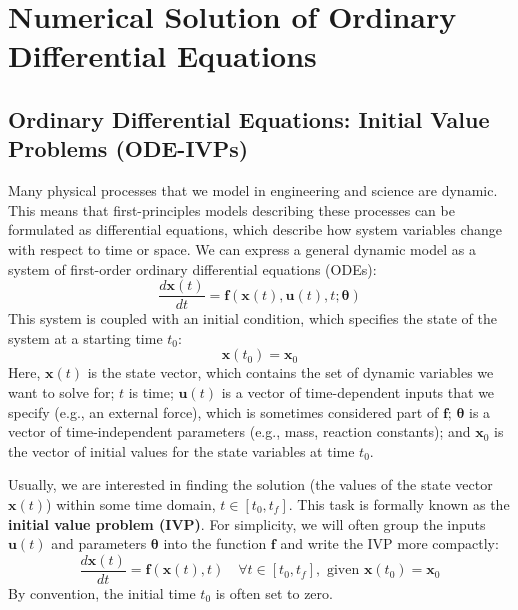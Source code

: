 \chapter{Numerical Solution of Ordinary Differential Equations}

\section{Ordinary Differential Equations: Initial Value Problems (ODE-IVPs)}

Many physical processes that we model in engineering and science are dynamic. This means that first-principles models describing these processes can be formulated as differential equations, which describe how system variables change with respect to time or space. We can express a general dynamic model as a system of first-order ordinary differential equations (ODEs):
\begin{equation}
    \frac{d\mathbf{x}(t)}{dt} = \mathbf{f}(\mathbf{x}(t), \mathbf{u}(t), t; \boldsymbol{\theta})
\end{equation}
This system is coupled with an initial condition, which specifies the state of the system at a starting time $t_0$:
\begin{equation}
    \mathbf{x}(t_0) = \mathbf{x}_0
\end{equation}
Here, $\mathbf{x}(t)$ is the state vector, which contains the set of dynamic variables we want to solve for; $t$ is time; $\mathbf{u}(t)$ is a vector of time-dependent inputs that we specify (e.g., an external force), which is sometimes considered part of $\mathbf{f}$; $\boldsymbol{\theta}$ is a vector of time-independent parameters (e.g., mass, reaction constants); and $\mathbf{x}_0$ is the vector of initial values for the state variables at time $t_0$.

Usually, we are interested in finding the solution (the values of the state vector $\mathbf{x}(t)$) within some time domain, $t \in [t_0, t_f]$. This task is formally known as the \textbf{initial value problem (IVP)}. For simplicity, we will often group the inputs $\mathbf{u}(t)$ and parameters $\boldsymbol{\theta}$ into the function $\mathbf{f}$ and write the IVP more compactly:
\begin{equation}
    \frac{d\mathbf{x}(t)}{dt} = \mathbf{f}(\mathbf{x}(t), t) \quad \forall t \in [t_0, t_f], \text{ given } \mathbf{x}(t_0) = \mathbf{x}_0
    \label{eq:ode-ivp}
\end{equation}
By convention, the initial time $t_0$ is often set to zero.


